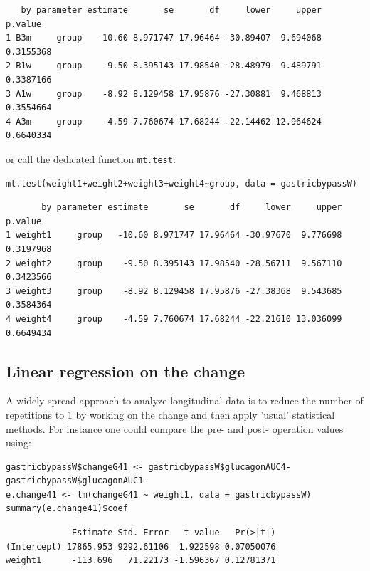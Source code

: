 \documentclass[12pt]{article}
\begin{document}
\begin{verbatim}
   by parameter estimate       se       df     lower     upper   p.value
1 B3m     group   -10.60 8.971747 17.96464 -30.89407  9.694068 0.3155368
2 B1w     group    -9.50 8.395143 17.98540 -28.48979  9.489791 0.3387166
3 A1w     group    -8.92 8.129458 17.95876 -27.30881  9.468813 0.3554664
4 A3m     group    -4.59 7.760674 17.68244 -22.14462 12.964624 0.6640334
\end{verbatim}


or call the dedicated function \texttt{mt.test}:
\lstset{language=r,label= ,caption= ,captionpos=b,numbers=none}
\begin{lstlisting}
mt.test(weight1+weight2+weight3+weight4~group, data = gastricbypassW)
\end{lstlisting}

\begin{verbatim}
       by parameter estimate       se       df     lower     upper   p.value
1 weight1     group   -10.60 8.971747 17.96464 -30.97670  9.776698 0.3197968
2 weight2     group    -9.50 8.395143 17.98540 -28.56711  9.567110 0.3423566
3 weight3     group    -8.92 8.129458 17.95876 -27.38368  9.543685 0.3584364
4 weight4     group    -4.59 7.760674 17.68244 -22.21610 13.036099 0.6649434
\end{verbatim}

\subsection{Linear regression on the change}
\label{sec:orgfd280ab}

A widely spread approach to analyze longitudinal data is to reduce the
number of repetitions to 1 by working on the change and then apply
'usual' statistical methods. For instance one could compare the pre-
and post- operation values using:

\lstset{language=r,label= ,caption= ,captionpos=b,numbers=none}
\begin{lstlisting}
gastricbypassW$changeG41 <- gastricbypassW$glucagonAUC4-gastricbypassW$glucagonAUC1
e.change41 <- lm(changeG41 ~ weight1, data = gastricbypassW)
summary(e.change41)$coef
\end{lstlisting}

\begin{verbatim}
             Estimate Std. Error   t value   Pr(>|t|)
(Intercept) 17865.953 9292.61106  1.922598 0.07050076
weight1      -113.696   71.22173 -1.596367 0.12781371
\end{verbatim}
\end{document}
